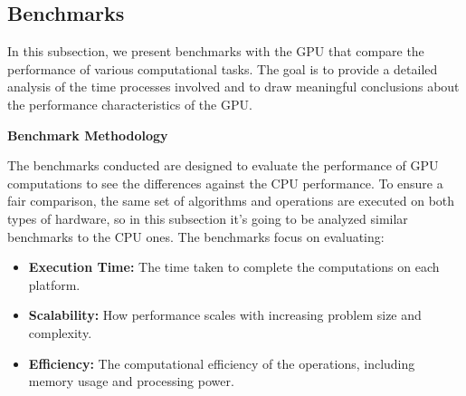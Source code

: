 \subsection{Benchmarks}

In this subsection, we present benchmarks with the GPU that compare the performance of various computational tasks. The goal is to provide a detailed analysis of the time processes involved and to draw meaningful conclusions about the performance characteristics of the GPU.

\begin{center}
   \textbf{Benchmark Methodology}
\end{center}

The benchmarks conducted are designed to evaluate the performance of GPU computations to see the differences against the CPU performance. To ensure a fair comparison, the same set of algorithms and operations are executed on both types of hardware, so in this subsection it's going to be analyzed similar benchmarks to the CPU ones. The benchmarks focus on evaluating:

\begin{itemize}
    \item \textbf{Execution Time:} The time taken to complete the computations on each platform.
    \item \textbf{Scalability:} How performance scales with increasing problem size and complexity.
    \item \textbf{Efficiency:} The computational efficiency of the operations, including memory usage and processing power.
\end{itemize}





